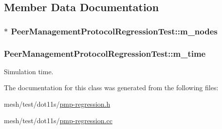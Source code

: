 \subsection{Member Data Documentation}
\subsubsection[{\texorpdfstring{m\+\_\+nodes}{m_nodes}}]{$\ast$ Peer\+Management\+Protocol\+Regression\+Test\+::m\+\_\+nodes\hspace{0.3cm}{\ttfamily [private]}}\hypertarget{classPeerManagementProtocolRegressionTest_ac19c6874aa4fd4a8d22ee2df374a619c}{}\label{classPeerManagementProtocolRegressionTest_ac19c6874aa4fd4a8d22ee2df374a619c}
\subsubsection[{\texorpdfstring{m\+\_\+time}{m_time}}]{ Peer\+Management\+Protocol\+Regression\+Test\+::m\+\_\+time\hspace{0.3cm}{\ttfamily [private]}}\hypertarget{classPeerManagementProtocolRegressionTest_a586c55d82b9d8c37fb75b8622ad99faa}{}\label{classPeerManagementProtocolRegressionTest_a586c55d82b9d8c37fb75b8622ad99faa}


Simulation time. 



The documentation for this class was generated from the following files\+:\begin{DoxyCompactItemize}
\item 
mesh/test/dot11s/\hyperlink{pmp-regression_8h}{pmp-\/regression.\+h}\item 
mesh/test/dot11s/\hyperlink{pmp-regression_8cc}{pmp-\/regression.\+cc}\end{DoxyCompactItemize}

